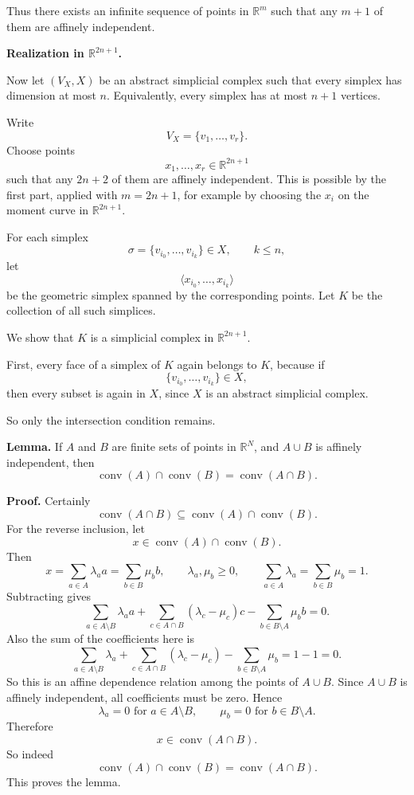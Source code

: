 \documentclass[12pt,a4paper]{article}
\theoremstyle{notespace}
\begin{document}
Thus there exists an infinite sequence of points in \(\mathbb R^m\) such that any \(m+1\) of them are affinely independent.

\medskip

\textbf{Realization in \(\mathbb R^{2n+1}\).}

Now let \((V_X,X)\) be an abstract simplicial complex such that every simplex has dimension at most \(n\). Equivalently, every simplex has at most \(n+1\) vertices.

Write
\[
V_X=\{v_1,\dots,v_r\}.
\]
Choose points
\[
x_1,\dots,x_r\in \mathbb R^{2n+1}
\]
such that any \(2n+2\) of them are affinely independent. This is possible by the first part, applied with \(m=2n+1\), for example by choosing the \(x_i\) on the moment curve in \(\mathbb R^{2n+1}\).

For each simplex
\[
\sigma=\{v_{i_0},\dots,v_{i_k}\}\in X,
\qquad k\le n,
\]
let
\[
\langle x_{i_0},\dots,x_{i_k}\rangle
\]
be the geometric simplex spanned by the corresponding points. Let \(K\) be the collection of all such simplices.

We show that \(K\) is a simplicial complex in \(\mathbb R^{2n+1}\).

First, every face of a simplex of \(K\) again belongs to \(K\), because if
\[
\{v_{i_0},\dots,v_{i_k}\}\in X,
\]
then every subset is again in \(X\), since \(X\) is an abstract simplicial complex.

So only the intersection condition remains.

\medskip

\textbf{Lemma.}
If \(A\) and \(B\) are finite sets of points in \(\mathbb R^N\), and \(A\cup B\) is affinely independent, then
\[
\operatorname{conv}(A)\cap \operatorname{conv}(B)=\operatorname{conv}(A\cap B).
\]

\textbf{Proof.}
Certainly
\[
\operatorname{conv}(A\cap B)\subseteq \operatorname{conv}(A)\cap \operatorname{conv}(B).
\]
For the reverse inclusion, let
\[
x\in \operatorname{conv}(A)\cap \operatorname{conv}(B).
\]
Then
\[
x=\sum_{a\in A}\lambda_a a=\sum_{b\in B}\mu_b b,
\qquad
\lambda_a,\mu_b\ge 0,
\qquad
\sum_{a\in A}\lambda_a=\sum_{b\in B}\mu_b=1.
\]
Subtracting gives
\[
\sum_{a\in A\setminus B}\lambda_a a
+\sum_{c\in A\cap B}(\lambda_c-\mu_c)c
-\sum_{b\in B\setminus A}\mu_b b=0.
\]
Also the sum of the coefficients here is
\[
\sum_{a\in A\setminus B}\lambda_a
+\sum_{c\in A\cap B}(\lambda_c-\mu_c)
-\sum_{b\in B\setminus A}\mu_b
=
1-1=0.
\]
So this is an affine dependence relation among the points of \(A\cup B\). Since \(A\cup B\) is affinely independent, all coefficients must be zero. Hence
\[
\lambda_a=0 \text{ for } a\in A\setminus B,
\qquad
\mu_b=0 \text{ for } b\in B\setminus A.
\]
Therefore
\[
x\in \operatorname{conv}(A\cap B).
\]
So indeed
\[
\operatorname{conv}(A)\cap \operatorname{conv}(B)=\operatorname{conv}(A\cap B).
\]
This proves the lemma.
\end{document}

